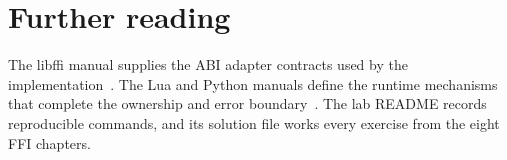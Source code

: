 \section{Further reading}
\label{sec:ch76-reading}
The libffi manual supplies the ABI adapter contracts used by the implementation~\cite{libffi-2026-manual}.
The Lua and Python manuals define the runtime mechanisms that complete the ownership and error boundary~\cite{ierusalimschy-2026-lua,python-2026-capi}.
The lab README records reproducible commands, and its solution file works every exercise from the eight FFI chapters.
